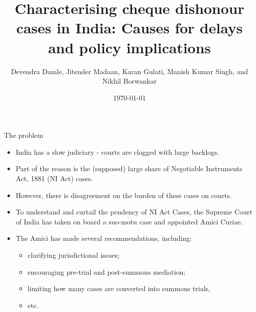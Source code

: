 \documentclass[10pt,aspectratio=169]{beamer}
\title{Characterising cheque dishonour cases in India: Causes for delays and policy implications}
\author{Devendra Damle, Jitender Madaan, Karan Gulati, Manish Kumar Singh, and Nikhil Borwankar}
\date{\today}
\begin{document}
\frame{\maketitle}

\begin{frame}{The problem}
\begin{itemize}
 \item India has a slow judiciary - courts are clogged with large backlogs.
 \item Part of the reason is the (supposed) large share of Negotiable Instruments Act, 1881 (NI Act) cases.
 \item However, there is disagreement on the burden of these cases on courts. 
 \item To understand and curtail the pendency of NI Act Cases, the Supreme Court of India has taken on board a suo-motu case and appointed Amici Curiae.
 \item The Amici has made several recommendations, including:
 \begin{itemize}
 \item clarifying jurisdictional issues;
 \item encouraging pre-trial and post-summons mediation;
 \item limiting how many cases are converted into summons trials, 
 \item etc. 
 \end{itemize}
\end{itemize}
\end{frame}
\end{document}
